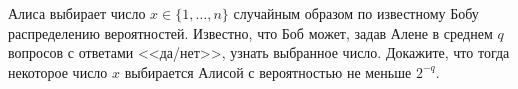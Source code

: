 Алиса выбирает число $x \in \{1, \dots, n\}$ случайным образом по известному Бобу распределению
вероятностей. Известно, что Боб может, задав Алене в среднем $q$ вопросов с ответами <<да/нет>>, узнать
выбранное число. Докажите, что тогда некоторое число $x$ выбирается Алисой с вероятностью не меньше $2^{-q}$.